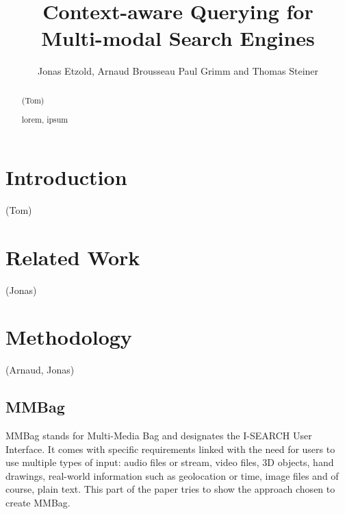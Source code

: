 \documentclass[runningheads,a4paper]{llncs}
\newcommand{\keywords}[1]{\par\addvspace\baselineskip
\noindent\keywordname\enspace\ignorespaces#1}
\begin{document}
\mainmatter  %

\title{Context-aware Querying for\\ Multi-modal Search Engines}


\author{Jonas Etzold, Arnaud Brousseau Paul Grimm and Thomas Steiner}



\maketitle

\begin{abstract}
(Tom)
\keywords{lorem, ipsum}
\end{abstract}

\section{Introduction}
(Tom) \cite{ijmis}

\section{Related Work}
(Jonas) \cite{nigay}

\section{Methodology}
(Arnaud, Jonas)

\subsection{MMBag}

MMBag stands for Multi-Media Bag and designates the I-SEARCH User Interface. It comes with specific requirements linked with the need for users to use multiple types of input: audio files or stream, video files, 3D objects, hand drawings, real-world information such as geolocation or time, image files and of course, plain text. This part of the paper tries to show the approach chosen to create MMBag.
\end{document}
